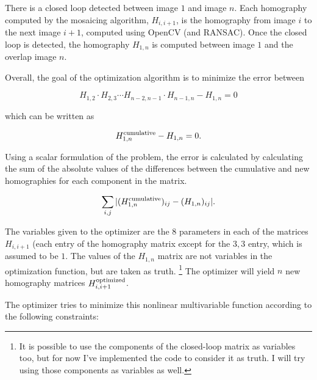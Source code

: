 \documentclass{article}
\begin{document}
There is a closed loop detected between image $1$ and image $n$. Each
homography computed by the mosaicing algorithm, $H_{i, i + 1}$, is the
homography from image $i$ to the next image $i + 1$, computed using OpenCV (and
RANSAC). Once the closed loop is detected, the homography $H_{1, n}$ is
computed between image $1$ and the overlap image $n$. 

Overall, the goal of the optimization algorithm is to minimize the error
between
 
\[H_{1, 2} \cdot H_{2, 3} \cdots H_{n - 2, n - 1} \cdot H_{n - 1, n} - H_{1, n} = 0\]

which can be written as

\[H_{1, n}^{\textnormal{cumulative}} - H_{1, n} = 0.\]

Using a scalar formulation of the problem, the error is calculated by
calculating the sum of the absolute values of the differences between the
cumulative and new homographies for each component in the matrix.

\[\sum_{i,j} |(H_{1, n}^{\textnormal{cumulative}})_{ij} - (H_{1, n})_{ij}|.\]

The variables given to the optimizer are the $8$ parameters in each of the
matrices $H_{i, i + 1}$ (each entry of the homography matrix except for the $3,
3$ entry, which is assumed to be $1$. The values of the $H_{1, n}$ matrix are
not variables in the optimization function, but are taken as truth.
\footnote{It is possible to use the components of the closed-loop matrix as
variables too, but for now I've implemented the code to consider it as truth. I
will try using those components as variables as well.} The optimizer will yield
$n$ new homography matrices $H_{i, i+1}^{\textnormal{optimized}}$. 

The optimizer tries to minimize this nonlinear multivariable function according
to the following constraints:
\end{document}
